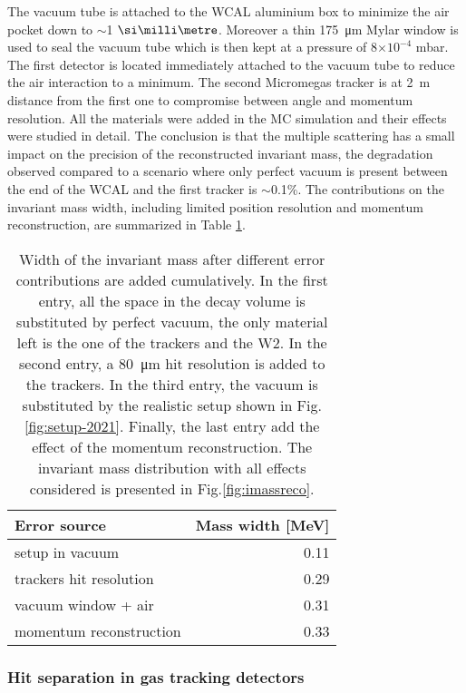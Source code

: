 The vacuum tube is attached to the WCAL aluminium box to minimize the air pocket down to $\sim$1 $\mmi$. Moreover a thin \SI{175}{\micro\meter} Mylar window is used to seal the vacuum tube which is then kept at a pressure of 8$\times 10^{-4}$ \si{\milli\bar}. The first detector is located immediately attached to the vacuum tube to reduce the air interaction to a minimum. The second Micromegas tracker is at \SI{2}{\meter} distance from the first one to compromise between angle and momentum resolution. All the materials were added in the MC simulation and their effects were studied in detail. The conclusion is that the multiple scattering has a small impact on the precision of the reconstructed invariant mass, the degradation observed compared to a scenario where only perfect vacuum is present between the end of the WCAL and the first tracker is $\sim$0.1\%. The contributions on the invariant mass width, including limited position resolution and momentum reconstruction, are summarized in Table \ref{tab:imass-width}.

\begin{center}
  \begin{table}[bth!]
    \centering
    \begin{tabular}{|l|r|}
      \hline
      Error source & Mass width [MeV]\\
      \hline
      setup in vacuum & 0.11\\
      trackers hit resolution & 0.29\\
      vacuum window + air & 0.31\\
      momentum reconstruction & 0.33\\
      \hline
    \end{tabular}
    \caption[Error budget for the invariant mass in 2021 setup]{Width of the invariant mass after different error contributions are added cumulatively. In the first entry, all the space in the decay volume is substituted by perfect vacuum, the only material left is the one of the trackers and the W2. In the second entry, a \SI{80}{\micro\meter} hit resolution is added to the trackers. In the third entry, the vacuum is substituted by the realistic setup shown in Fig.\ref{fig:setup-2021}. Finally, the last entry add the effect of the momentum reconstruction. The invariant mass distribution with all effects considered is presented in Fig.\ref{fig:imassreco}.}
    \label{tab:imass-width}    
  \end{table}
\end{center}

\subsubsection{Hit separation in gas tracking detectors}
\label{ch5:sec:separ-hit-micr}

